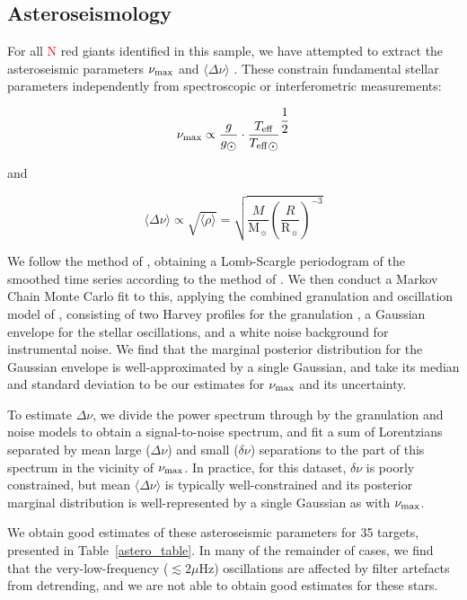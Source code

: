\documentclass[a4paper,fleqn,usenatbib]{mnras}
\newcommand{\numax}{\mbox{$\nu_{\rm max}$}\xspace}
\newcommand{\Dnu}{\mbox{$\Delta \nu$}\xspace}
\newcommand{\dnu}{\mbox{$\delta \nu$}\xspace}
\newcommand{\muHz}{\mbox{$\mu$Hz}\xspace}
\newcommand{\teff}{\mbox{$T_{\rm eff}$}\xspace}
\newcommand{\msun}{\mbox{$\mathrm{M}_{\sun}$}\xspace}
\newcommand{\rsun}{\mbox{$\mathrm{R}_{\sun}$}\xspace}
\begin{document}



\subsection{Asteroseismology}
\label{asteroseismology}

For all \textcolor{red}{N} red giants identified in this sample, we have attempted to extract the asteroseismic parameters \numax and $\langle \Dnu \rangle$ \citep{KB95,2013ARA&A..51..353C}. These constrain fundamental stellar parameters independently from spectroscopic or interferometric measurements: 

\begin{equation}
\label{scaling}
\numax \propto \dfrac{g}{g_{\sun}} \cdot \dfrac{\teff}{\teff_{\sun}}^{\dfrac{1}{2}}
\end{equation}

and

\begin{equation}
\langle \Dnu \rangle \propto \sqrt{\langle \rho \rangle} = \sqrt{\dfrac{M}{\msun} (\dfrac{R}{\rsun})^{-3}}
\end{equation}

We follow the method of \citet{2016AN....337..774D}, obtaining a Lomb-Scargle periodogram of the smoothed time series according to the method of \citet{2011MNRAS.414L...6G}. We then conduct a Markov Chain Monte Carlo fit to this, applying the combined granulation and oscillation model of \citet{2014A&A...570A..41K}, consisting of two Harvey profiles for the granulation \citep{1985ESASP.235..199H}, a Gaussian envelope for the stellar oscillations, and a white noise background for instrumental noise. We find that the marginal posterior distribution for the Gaussian envelope is well-approximated by a single Gaussian, and take its median and standard deviation to be our estimates for \numax and its uncertainty.

To estimate \Dnu, we divide the power spectrum through by the granulation and noise models to obtain a signal-to-noise spectrum, and fit a sum of Lorentzians separated by mean large (\Dnu) and small (\dnu) separations to the part of this spectrum in the vicinity of \numax. In practice, for this dataset, \dnu is poorly constrained, but mean $\langle \Dnu \rangle$ is typically well-constrained and its posterior marginal distribution is well-represented by a single Gaussian as with \numax. 

We obtain good estimates of these asteroseismic parameters for 35 targets, presented in Table~\ref{astero_table}. In many of the remainder of cases, we find that the very-low-frequency ($\lesssim 2\muHz$) oscillations are affected by filter artefacts from detrending, and we are not able to obtain good estimates for these stars. 
\end{document}
